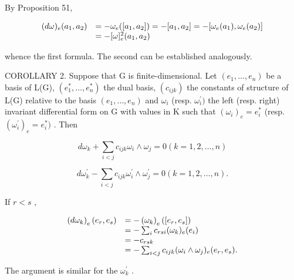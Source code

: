 By Proposition 51,

\[
\begin{array}{r l} (d \omega) _ {e} (a _ {1}, a _ {2}) & = - \omega_ {e} ([ a _ {1}, a _ {2} ]) = - [ a _ {1}, a _ {2} ] = - [ \omega_ {e} (a _ {1}), \omega_ {e} (a _ {2}) ] \\ & = - [ \omega ] _ {e} ^ {2} (a _ {1}, a _ {2}) \end{array}
\]

whence the first formula. The second can be established analogously.

COROLLARY 2. Suppose that G is finite-dimensional. Let \((e_1, \ldots, e_n)\) be a basis of L(G), \((e_1^*, \ldots, e_n^*)\) the dual basis, \((c_{ijk})\) the constants of structure of L(G) relative to the basis \((e_1, \ldots, e_n)\) and \(\omega_i\) (resp. \(\omega_i^{\prime})\) the left (resp. right) invariant differential form on G with values in K such that \((\omega_i)_e = e_i^*\) (resp. \((\omega_i^{\prime})_e = e_i^*)\) . Then

\[
d \omega_ {k} + \sum_ {i <   j} c _ {i j k} \omega_ {i} \wedge \omega_ {j} = 0 (k = 1, 2, \dots , n)
\]

\[
d \omega_ {k} ^ {\prime} - \sum_ {i <   j} c _ {i j k} \omega_ {i} ^ {\prime} \wedge \omega_ {j} ^ {\prime} = 0 (k = 1, 2, \dots , n).
\]

If \(r < s\) ,

\[
\begin{array}{r l} \left(d \omega_ {k}\right) _ {e} (e _ {r}, e _ {s}) & = - \left(\omega_ {k}\right) _ {e} ([ e _ {r}, e _ {s} ]) \\ & = - \sum_ {i} c _ {r s i} (\omega_ {k}) _ {e} (e _ {i}) \\ & = - c _ {r s k} \\ & = - \sum_ {i <   j} c _ {i j k} (\omega_ {i} \wedge \omega_ {j}) _ {e} (e _ {r}, e _ {s}). \end{array}
\]

The argument is similar for the \(\omega_{k}^{\prime}\) .

